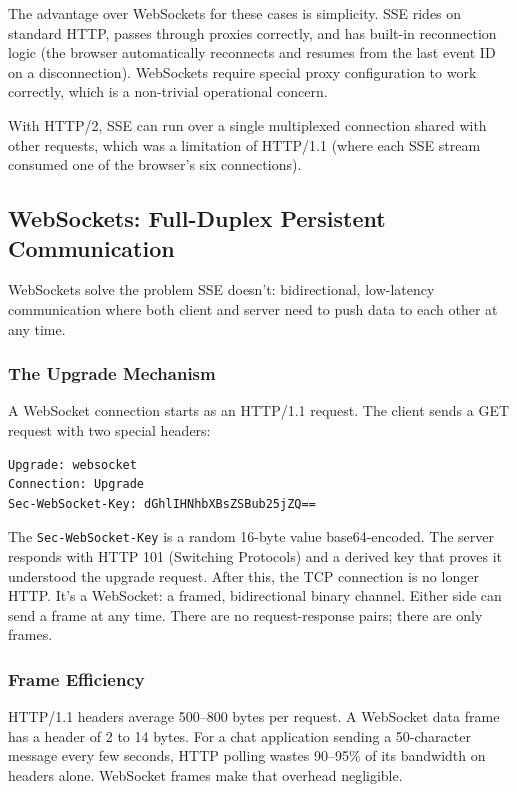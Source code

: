 \documentclass[11pt,a4paper]{article}
\begin{document}
The advantage over WebSockets for these cases is simplicity. SSE rides on standard HTTP, passes through proxies correctly, and has built-in reconnection logic (the browser automatically reconnects and resumes from the last event ID on a disconnection). WebSockets require special proxy configuration to work correctly, which is a non-trivial operational concern.

With HTTP/2, SSE can run over a single multiplexed connection shared with other requests, which was a limitation of HTTP/1.1 (where each SSE stream consumed one of the browser's six connections).

\subsection{WebSockets: Full-Duplex Persistent Communication}

WebSockets solve the problem SSE doesn't: bidirectional, low-latency communication where both client and server need to push data to each other at any time.

\subsubsection{The Upgrade Mechanism}

A WebSocket connection starts as an HTTP/1.1 request. The client sends a GET request with two special headers:

\begin{verbatim}
Upgrade: websocket
Connection: Upgrade
Sec-WebSocket-Key: dGhlIHNhbXBsZSBub25jZQ==
\end{verbatim}

The \texttt{Sec-WebSocket-Key} is a random 16-byte value base64-encoded. The server responds with HTTP 101 (Switching Protocols) and a derived key that proves it understood the upgrade request. After this, the TCP connection is no longer HTTP. It's a WebSocket: a framed, bidirectional binary channel. Either side can send a frame at any time. There are no request-response pairs; there are only frames.

\subsubsection{Frame Efficiency}

HTTP/1.1 headers average 500--800 bytes per request. A WebSocket data frame has a header of 2 to 14 bytes. For a chat application sending a 50-character message every few seconds, HTTP polling wastes 90--95\% of its bandwidth on headers alone. WebSocket frames make that overhead negligible.
\end{document}
